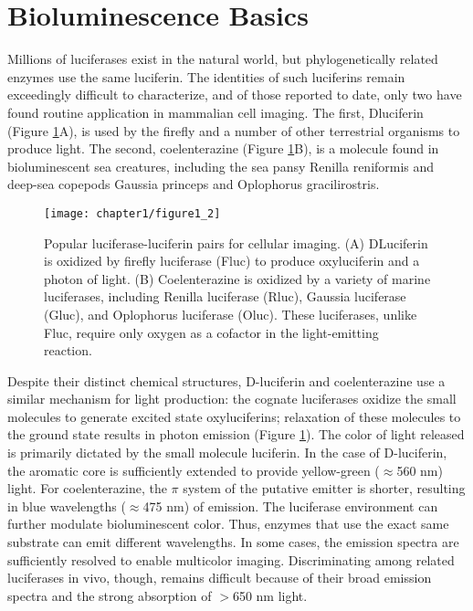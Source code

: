 \section{Bioluminescence Basics}
Millions of luciferases exist in the natural world, but
phylogenetically related enzymes use the same luciferin.\cite{Martini:2017ig} The
identities of such luciferins remain exceedingly difficult to
characterize, and of those reported to date, only two have found
routine application in mammalian cell imaging.\cite{RN26} The first, Dluciferin
(Figure \ref{fig:luc_oxidation}A), is used by the firefly and a number of
other terrestrial organisms to produce light. The second,
coelenterazine (Figure \ref{fig:luc_oxidation}B), is a molecule found in bioluminescent
sea creatures, including the sea pansy Renilla
reniformis and deep-sea copepods Gaussia princeps and
Oplophorus gracilirostris. 

\begin{figure}[htbp]
\texttt{[image: chapter1/figure1\_2]}
\centering
\caption[Popular luciferase-luciferin pairs for cellular imaging]{Popular luciferase-luciferin pairs for cellular imaging. (A) DLuciferin
is oxidized by firefly luciferase (Fluc) to produce oxyluciferin
and a photon of light. (B) Coelenterazine is oxidized by a variety of
marine luciferases, including Renilla luciferase (Rluc), Gaussia
luciferase (Gluc), and Oplophorus luciferase (Oluc). These luciferases,
unlike Fluc, require only oxygen as a cofactor in the light-emitting
reaction.}
  \label{fig:luc_oxidation}
\end{figure}

Despite their distinct chemical
structures, D-luciferin and coelenterazine use a similar
mechanism for light production: the cognate luciferases oxidize
the small molecules to generate excited state oxyluciferins;
relaxation of these molecules to the ground state results in
photon emission (Figure \ref{fig:luc_oxidation}).
The color of light released is primarily dictated by the small
molecule luciferin. In the case of D-luciferin, the aromatic core
is sufficiently extended to provide yellow-green ($\approx$560 nm)
light. For coelenterazine, the $\pi$ system of the putative emitter is
shorter, resulting in blue wavelengths ($\approx$475 nm) of emission.
The luciferase environment can further modulate bioluminescent
color. Thus, enzymes that use the exact same substrate can
emit different wavelengths. In some cases, the emission spectra
are sufficiently resolved to enable multicolor imaging.\cite{Suzuki:2016jw}
Discriminating among related luciferases in vivo, though,
remains difficult because of their broad emission spectra and
the strong absorption of $>$650 nm light.\cite{Zhao:2005if}
